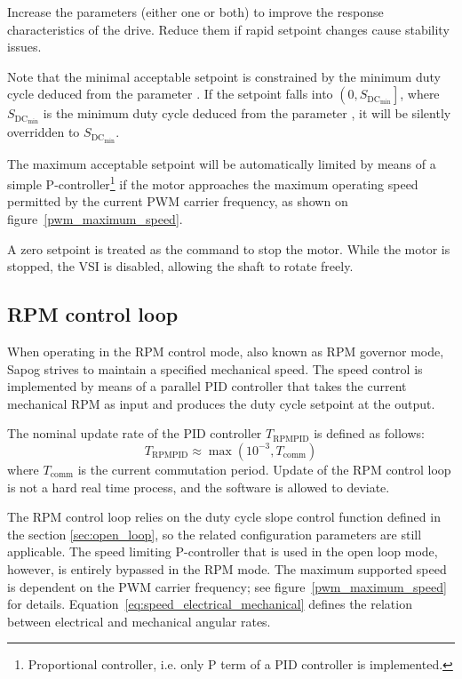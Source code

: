 \documentclass{zubaxdoc}
\begin{document}
Increase the parameters (either one or both) to improve the response characteristics of the drive.
Reduce them if rapid setpoint changes cause stability issues.

Note that the minimal acceptable setpoint is constrained by the minimum duty cycle deduced from
the parameter .
If the setpoint falls into $\left(0, S_{\text{DC}_\text{min}}\right]$,
where $S_{\text{DC}_\text{min}}$ is the minimum
duty cycle deduced from the parameter ,
it will be silently overridden to $S_{\text{DC}_\text{min}}$.

The maximum acceptable setpoint will be automatically limited by means of a simple
P-controller\footnote{Proportional controller, i.e. only P term of a PID controller is implemented.}
if the motor approaches the maximum operating speed permitted by the
current PWM carrier frequency, as shown on figure~\ref{pwm_maximum_speed}.

A zero setpoint is treated as the command to stop the motor.
While the motor is stopped, the VSI is disabled, allowing the shaft to rotate freely.

\subsection{RPM control loop}\label{sec:rpm_loop}

When operating in the RPM control mode, also known as RPM governor mode,
Sapog strives to maintain a specified mechanical speed.
The speed control is implemented by means of a parallel PID controller
that takes the current mechanical RPM as input and
produces the duty cycle setpoint at the output.

The nominal update rate of the PID controller $T_{\text{RPMPID}}$ is defined as follows:
\begin{equation}\label{eq:rpm_pid_control_loop_period}
T_{\text{RPMPID}} \approx \max \left(10^{-3},T_{\text{comm}}\right)
\end{equation}
where $T_\text{comm}$ is the current commutation period.
Update of the RPM control loop is not a hard real time process, and the software is allowed to
deviate.

The RPM control loop relies on the duty cycle slope control function defined in the section
\ref{sec:open_loop}, so the related configuration parameters are still applicable.
The speed limiting P-controller that is used in the open loop mode, however,
is entirely bypassed in the RPM mode.
The maximum supported speed is dependent on the PWM carrier frequency;
see figure~\ref{pwm_maximum_speed} for details.
Equation~\ref{eq:speed_electrical_mechanical} defines the relation between electrical
and mechanical angular rates.
\end{document}

